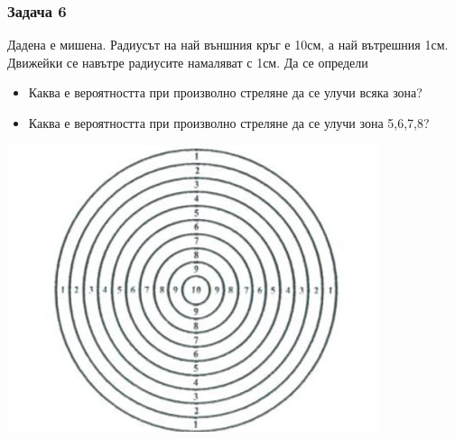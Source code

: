 \documentclass[fleqn, 12pt]{article}
\theoremstyle{definition}
\begin{document}
\subsubsection*{Задача 6}
Дадена е мишена. Радиусът на най външния кръг е 10см, а най вътрешния 1см. Движейки се навътре радиусите намаляват с 1см. Да се определи 
\begin{itemize}
\item Каква е вероятността при произволно стреляне да се улучи всяка зона?
\item Каква е вероятността при произволно стреляне да се улучи зона 5,6,7,8?
\end{itemize}
\begin{center}
\includegraphics{Pics/Discrete math/ex10/ex10-task6.png}
\end{center}
\end{document}
